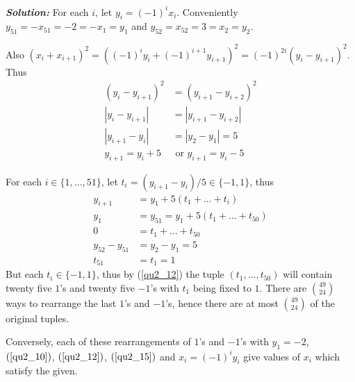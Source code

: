 \documentclass[12pt]{article}
\newcommand{\sol}{\textbf{\textit{Solution: }}}
\begin{document}
\begin{enumerate}[topsep=\bigskipamount,itemsep=\bigskipamount,leftmargin=0pt]
\sol
For each $i$, let $y_i = (-1)^i x_i$.
Conveniently $y_{51} = -x_{51} = -2 = -x_1 = y_1$
and $y_{52} = x_{52} = 3 = x_2 = y_2$.

Also $(x_i+x_{i+1})^2 = ((-1)^i y_i+(-1)^{i+1} y_{i+1})^2 = (-1)^{2i}(y_i-y_{i+1})^2$.
Thus 
\begin{align*}
    (y_i - y_{i+1})^2 & = (y_{i+1}-y_{i+2})^2\\
    |y_i - y_{i+1}| & = |y_{i+1}-y_{i+2}|\\
    |y_{i+1} - y_i| & = |y_2 - y_1| = 5\\
    y_{i+1} = y_i + 5 & \text{ or } y_{i+1} = y_i - 5
\end{align*}

For each $i\in\{1,\dots,51\}$, let $t_i = (y_{i+1}-y_i)/5\in\{-1,1\}$,
thus 
\begin{align}
y_{i+1} & = y_1 + 5(t_1 + \dots + t_{i}) \label{qu2_10}\\
y_1 & = y_{51} = y_1 + 5(t_1 + \dots + t_{50})\nonumber\\
0 & = t_1 + \dots + t_{50}\label{qu2_12}\\
y_{52}-y_{51} & = y_2-y_1 = 5\nonumber\\
t_{51} & = t_1 = 1\label{qu2_15}
\end{align}
But each $t_i\in\{-1,1\}$, thus by (\ref{qu2_12}) the tuple $(t_1, \dots, t_{50})$ will contain twenty five $1$'s and twenty five $-1$'s with $t_1$ being fixed to $1$.
There are $\binom{49}{24}$ ways to rearrange the last $1$'s and $-1$'s, hence there are at most $\binom{49}{24}$ of the original tuples.

Conversely, each of these rearrangements of $1$'s and $-1$'s with $y_1 = -2$, $(\ref{qu2_10})$, $(\ref{qu2_12})$, $(\ref{qu2_15})$ and $x_i = (-1)^i y_i$ give values of $x_i$ which satisfy the given.


\end{enumerate}
\end{document}
